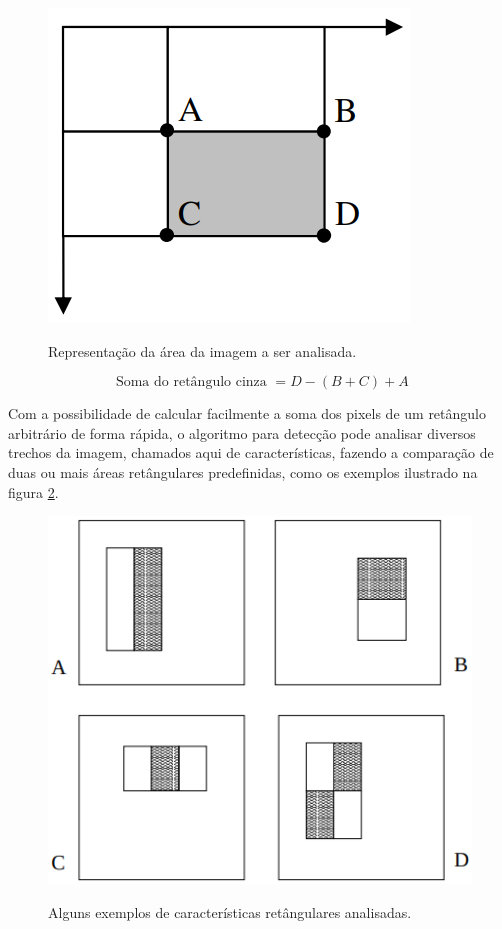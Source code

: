 \begin{figure}[htb]
    \centering
    \caption{Representação da área da imagem a ser analisada.}
    \includegraphics[scale=.3]{figs/imagem-integral-calculo.png}
    \label{fig:integral-calculo}
 \end{figure}

 \begin{equation}\label{eq:img-integral}
    \text{ Soma do retângulo cinza } = D - (B + C) + A
\end{equation}

Com a possibilidade de calcular facilmente a soma dos pixels de um retângulo arbitrário de forma rápida, o algoritmo para detecção pode analisar diversos trechos da imagem, chamados aqui de características, fazendo a comparação de duas ou mais áreas retângulares predefinidas, como os exemplos ilustrado na figura \ref{fig:features}. 

\begin{figure}[htb]
    \centering
    \caption{Alguns exemplos de características retângulares analisadas.}
    \includegraphics[scale=.3]{figs/features.png}
    \label{fig:features}
 \end{figure}

